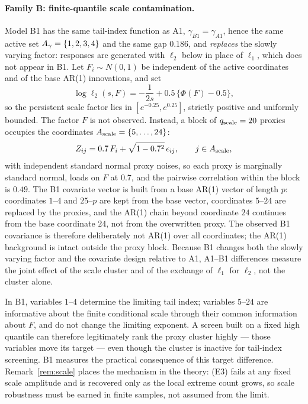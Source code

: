 \paragraph{Family B: finite-quantile scale contamination.}
Model B1 has the same tail-index function as A1,
$\gamma_{B1}=\gamma_{A1}$, hence the same active set
$A_\gamma=\{1,2,3,4\}$ and the same gap $0.186$, and \emph{replaces}
the slowly varying factor: responses are generated with $\ell_2$ below
in place of $\ell_1$, which does not appear in B1. Let
$F_i\sim N(0,1)$ be independent of the active coordinates and of the
base AR(1) innovations, and set
\[
 \log\ell_2(s,F)=-\frac1{2s}+0.5\,\bigl\{\Phi(F)-0.5\bigr\},
\]
so the persistent scale factor lies in $[e^{-0.25},e^{0.25}]$, strictly
positive and uniformly bounded. The factor $F$ is not observed. Instead,
a block of $q_{\rm scale}=20$ proxies occupies the coordinates
$A_{\rm scale}=\{5,\ldots,24\}$:
\[
 Z_{ij}=0.7\,F_i+\sqrt{1-0.7^2}\,\epsilon_{ij},
 \qquad j\in A_{\rm scale},
\]
with independent standard normal proxy noises, so each proxy is
marginally standard normal, loads on $F$ at $0.7$, and the pairwise
correlation within the block is $0.49$. The B1 covariate vector is
built from a base AR(1) vector of length $p$: coordinates $1$--$4$ and
$25$--$p$ are kept from the base vector, coordinates $5$--$24$ are
replaced by the proxies, and the AR(1) chain beyond coordinate $24$
continues from the base coordinate $24$, not from the overwritten
proxy. The observed B1 covariance is therefore deliberately not AR(1)
over all coordinates; the AR(1) background is intact outside the proxy
block. Because B1 changes both the slowly varying factor and the
covariate design relative to A1, A1--B1 differences measure the joint
effect of the scale cluster and of the exchange of $\ell_1$ for
$\ell_2$, not the cluster alone.

In B1, variables $1$--$4$ determine the limiting tail index; variables
$5$--$24$ are informative about the finite conditional scale through
their common information about $F$, and do not change the limiting
exponent. A screen built on a fixed high quantile can therefore
legitimately rank the proxy cluster highly --- those variables move its
target --- even though the cluster is inactive for tail-index
screening. B1 measures the practical consequence of this target
difference. Remark~\ref{rem:scale} places the mechanism in the theory:
(E3) fails at any fixed scale amplitude and is recovered only as the
local extreme count grows, so scale robustness must be earned in finite
samples, not assumed from the limit.

